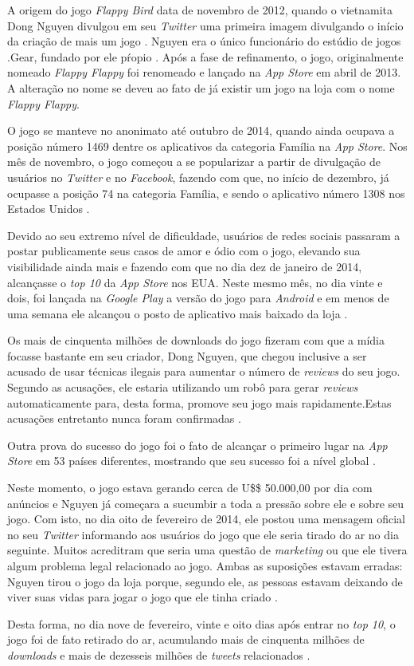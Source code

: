 A origem do jogo \textit{Flappy Bird} data de novembro de 2012, quando o vietnamita Dong Nguyen divulgou em seu \textit{Twitter} uma primeira imagem divulgando o início da criação de mais um jogo \cite{Warren2014}. Nguyen era o único funcionário do estúdio de jogos .Gear, fundado por ele pŕopio \cite{Harvard2014}. Após a fase de refinamento, o jogo, originalmente nomeado \textit{Flappy Flappy} foi renomeado e lançado na \textit{App Store} em abril de 2013. A alteração no nome se deveu ao fato de já existir um jogo na loja com o nome \textit{Flappy Flappy}.

O jogo se manteve no anonimato até outubro de 2014, quando ainda ocupava a posição número 1469 dentre os aplicativos da categoria Família na \textit{App Store}. Nos mês de novembro, o jogo começou a se popularizar a partir de divulgação de usuários no \textit{Twitter} e no \textit{Facebook}, fazendo com que, no início de dezembro, já ocupasse a posição 74 na categoria Família, e sendo o aplicativo número 1308 nos Estados Unidos \cite{Warren2014}.

Devido ao seu extremo nível de dificuldade, usuários de redes sociais passaram a postar publicamente seus casos de amor e ódio com o jogo, elevando sua visibilidade ainda mais e fazendo com que no dia dez de janeiro de 2014, alcançasse o \textit{top 10} da \textit{App Store} nos EUA. Neste mesmo mês, no dia vinte e dois, foi lançada na \textit{Google Play} a versão do jogo para \textit{Android} e em menos de uma semana ele alcançou o posto de aplicativo mais baixado da loja \cite{Warren2014}.

Os mais de cinquenta milhões de downloads do jogo fizeram com que a mídia focasse bastante em seu criador, Dong Nguyen, que chegou inclusive a ser acusado de usar técnicas ilegais para aumentar o número de \textit{reviews} do seu jogo. Segundo as acusações, ele estaria utilizando um robô para gerar \textit{reviews} automaticamente para, desta forma, promove seu jogo mais rapidamente.Estas acusações entretanto nunca foram confirmadas \cite{Warren2014}.

Outra prova do sucesso do jogo foi o fato de alcançar o primeiro lugar na \textit{App Store} em 53 países diferentes, mostrando que seu sucesso foi a nível global \cite{Warren2014}.

Neste momento, o jogo estava gerando cerca de U\$\$ 50.000,00 por dia com anúncios e Nguyen já começara a sucumbir a toda a pressão sobre ele e sobre seu jogo. Com isto, no dia oito de fevereiro de 2014, ele postou uma mensagem oficial no seu \textit{Twitter} informando aos usuários do jogo que ele seria tirado do ar no dia seguinte. Muitos acreditram que seria uma questão de \textit{marketing} ou que ele tivera algum problema legal relacionado ao jogo. Ambas as suposições estavam erradas: Nguyen tirou o jogo da loja porque, segundo ele, as pessoas estavam deixando de viver suas vidas para jogar o jogo que ele tinha criado \cite{Warren2014}.

Desta forma, no dia nove de fevereiro, vinte e oito dias após entrar no \textit{top 10}, o jogo foi de fato retirado do ar, acumulando mais de cinquenta milhões de \textit{downloads} e mais de dezesseis milhões de \textit{tweets} relacionados \cite{Warren2014}.


